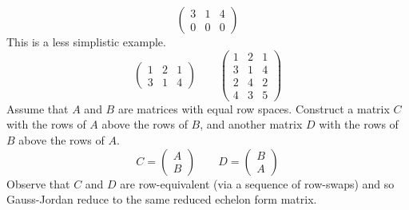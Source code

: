 \begin{exercises}
\begin{answer}
\begin{exparts}
\begin{equation*}
\begin{pmatrix}
              3  &1  &4  \\
              0  &0  &0
            \end{pmatrix}
          \end{equation*}
          This is a less simplistic example.
          \begin{equation*}
            \begin{pmatrix}
              1  &2  &1  \\
              3  &1  &4
            \end{pmatrix}
            \qquad
            \begin{pmatrix}
              1  &2  &1  \\
              3  &1  &4  \\
              2  &4  &2  \\
              4  &3  &5
            \end{pmatrix}
          \end{equation*}
        \partsitem Assume that \( A \) and \( B \) are matrices with equal
          row spaces.
          Construct a matrix \( C \) with the rows of \( A \) above the rows
          of \( B \), and another matrix \( D \) with the rows of \( B \)
          above the rows of \( A \).
          \begin{equation*}
            C=\begin{pmatrix}
                 A \\ B
              \end{pmatrix}
            \qquad
            D=\begin{pmatrix}
                 B \\ A
              \end{pmatrix}
          \end{equation*}
          Observe that \( C \) and \( D \) are row-equivalent (via a sequence
          of row-swaps) and so Gauss-Jordan reduce to the same reduced
          echelon form matrix.


\end{exparts}
\end{answer}
\end{exercises}
